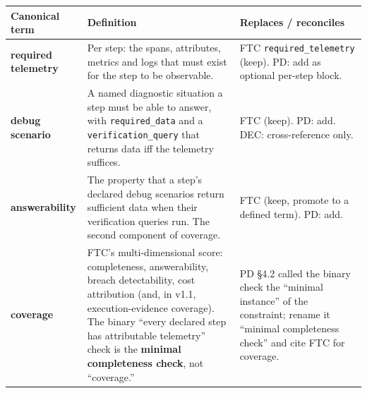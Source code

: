 \documentclass[11pt]{article}
\newcommand{\code}[1]{\texttt{#1}}
\begin{document}
\begin{center}
\footnotesize
\begin{tabular}{@{}p{2.7cm} p{7.1cm} p{5.6cm}@{}}
\toprule
\textbf{Canonical term} & \textbf{Definition} & \textbf{Replaces / reconciles} \\
\midrule
\textbf{required telemetry} & Per step: the spans, attributes, metrics and logs that must exist for the step to be observable. & FTC \code{required\_telemetry} (keep). PD: add as optional per-step block. \\
\addlinespace
\textbf{debug scenario} & A named diagnostic situation a step must be able to answer, with \code{required\_data} and a \code{verification\_query} that returns data iff the telemetry suffices. & FTC (keep). PD: add. DEC: cross-reference only. \\
\addlinespace
\textbf{answerability} & The property that a step's declared debug scenarios return sufficient data when their verification queries run. The second component of coverage. & FTC (keep, promote to a defined term). PD: add. \\
\addlinespace
\textbf{coverage} & FTC's multi-dimensional score: completeness, answerability, breach detectability, cost attribution (and, in v1.1, execution-evidence coverage). The binary ``every declared step has attributable telemetry'' check is the \textbf{minimal completeness check}, not ``coverage.'' & PD \S4.2 called the binary check the ``minimal instance'' of the constraint; rename it ``minimal completeness check'' and cite FTC for coverage. \\
\bottomrule
\end{tabular}
\end{center}
\end{document}
